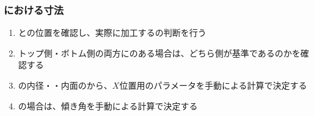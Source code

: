 \clearpage
\subsubsection{\Outcut における寸法}
\begin{enumerate}[label=\sarrow]
\item \OutcutLength と\Keyway の位置を確認し、実際に加工する\OutcutLength の判断を行う
\item トップ側・ボトム側の両方に\Outcut のある場合は、どちら側が基準であるのかを確認する
\item {}\nameEndFace の内径・\OutcutAsideThickness・内面の\PlatingThk から、\OutcutCenter$X$位置用のパラメータを手動による計算で決定する
\item \CurvedOutcut の場合は、傾き角を手動による計算で決定する
\end{enumerate}
